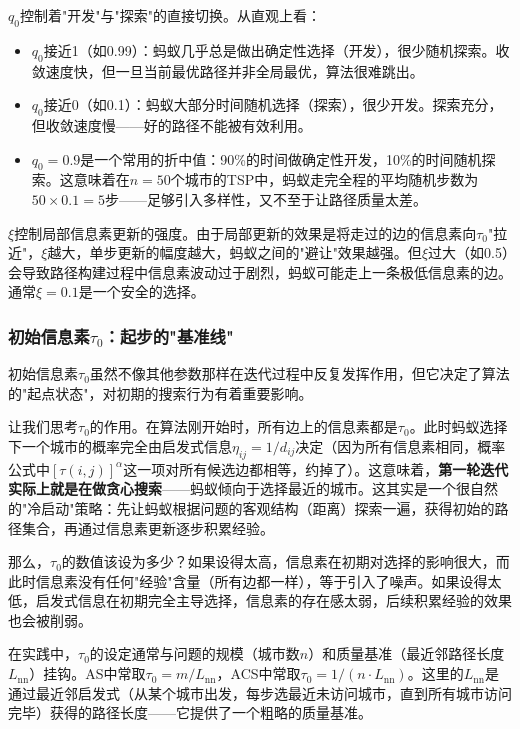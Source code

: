 \documentclass[lang=cn,zihao=-4,a4paper,fontset=windows]{beautybook}
\begin{document}
$q_0$控制着"开发"与"探索"的直接切换。从直观上看：
\begin{itemize}
    \item $q_0$接近1（如0.99）：蚂蚁几乎总是做出确定性选择（开发），很少随机探索。收敛速度快，但一旦当前最优路径并非全局最优，算法很难跳出。
    \item $q_0$接近0（如0.1）：蚂蚁大部分时间随机选择（探索），很少开发。探索充分，但收敛速度慢——好的路径不能被有效利用。
    \item $q_0 = 0.9$是一个常用的折中值：90\%的时间做确定性开发，10\%的时间随机探索。这意味着在$n=50$个城市的TSP中，蚂蚁走完全程的平均随机步数为$50 \times 0.1 = 5$步——足够引入多样性，又不至于让路径质量太差。
\end{itemize}

$\xi$控制局部信息素更新的强度。由于局部更新的效果是将走过的边的信息素向$\tau_0$"拉近"，$\xi$越大，单步更新的幅度越大，蚂蚁之间的"避让"效果越强。但$\xi$过大（如0.5）会导致路径构建过程中信息素波动过于剧烈，蚂蚁可能走上一条极低信息素的边。通常$\xi = 0.1$是一个安全的选择。

\subsubsection{初始信息素$\tau_0$：起步的"基准线"}

初始信息素$\tau_0$虽然不像其他参数那样在迭代过程中反复发挥作用，但它决定了算法的"起点状态"，对初期的搜索行为有着重要影响。

让我们思考$\tau_0$的作用。在算法刚开始时，所有边上的信息素都是$\tau_0$。此时蚂蚁选择下一个城市的概率完全由启发式信息$\eta_{ij} = 1/d_{ij}$决定（因为所有信息素相同，概率公式中$[\tau(i,j)]^\alpha$这一项对所有候选边都相等，约掉了）。这意味着，\textbf{第一轮迭代实际上就是在做贪心搜索}——蚂蚁倾向于选择最近的城市。这其实是一个很自然的"冷启动"策略：先让蚂蚁根据问题的客观结构（距离）探索一遍，获得初始的路径集合，再通过信息素更新逐步积累经验。

那么，$\tau_0$的数值该设为多少？如果设得太高，信息素在初期对选择的影响很大，而此时信息素没有任何"经验"含量（所有边都一样），等于引入了噪声。如果设得太低，启发式信息在初期完全主导选择，信息素的存在感太弱，后续积累经验的效果也会被削弱。

在实践中，$\tau_0$的设定通常与问题的规模（城市数$n$）和质量基准（最近邻路径长度$L_{\text{nn}}$）挂钩。AS中常取$\tau_0 = m / L_{\text{nn}}$，ACS中常取$\tau_0 = 1 / (n \cdot L_{\text{nn}})$。这里的$L_{\text{nn}}$是通过最近邻启发式（从某个城市出发，每步选最近未访问城市，直到所有城市访问完毕）获得的路径长度——它提供了一个粗略的质量基准。
\end{document}
